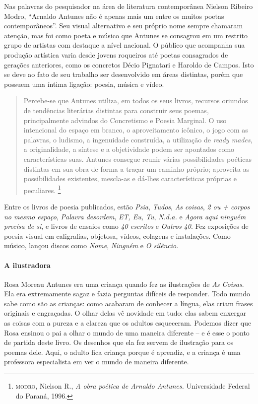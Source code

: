 \documentclass[11pt]{extarticle}
\begin{document}
Nas palavras do pesquisador na área de literatura contemporânea Nielson Ribeiro Modro, 
``Arnaldo Antunes não é apenas mais um entre os muitos poetas contemporâneos''.
Seu visual alternativo e seu próprio nome sempre chamaram atenção, mas foi como poeta 
e músico que Antunes se consagrou em um
restrito grupo de artistas com destaque a nível nacional. O público que acompanha sua
produção artística varia desde jovens roqueiros até poetas consagrados de gerações anteriores, como os concretos Décio
Pignatari e Haroldo de Campos. Isto se deve ao fato de seu trabalho ser desenvolvido em
áreas distintas, porém que possuem uma íntima ligação: poesia, música e vídeo.

\begin{quote}
Percebe-se que Antunes
utiliza, em todos os seus livros, recursos oriundos de tendências literárias distintas para
construir seus poemas, principalmente advindos do Concretismo e Poesia Marginal. O uso
intencional do espaço em branco, o aproveitamento icônico, o jogo com as palavras, o
ludismo, a ingenuidade construída, a utilização de \textit{ready mades}, a originalidade, a síntese e
a objetividade podem ser apontados como características suas. Antunes consegue reunir
várias possibilidades poéticas distintas em sua obra de forma a traçar um caminho próprio;
aproveita as possibilidades existentes, mescla-as e dá-lhes características próprias e
peculiares. \footnote{\textsc{modro}, Nielson R., \textit{A obra poética de Arnaldo Antunes.} Universidade Federal do Paraná, 1996.}
\end{quote}


Entre os livros de poesia publicados, estão \emph{Psia}, \emph{Tudos}, 
\emph{As coisas}, \emph{2 ou + corpos no mesmo espaço}, \emph{Palavra desordem}, 
\emph{ET, Eu, Tu}, \emph{N.d.a.} e \emph{Agora aqui ninguém precisa de si}, 
e livros de ensaios como \emph{40 escritos} e \emph{Outros 40}.  
Fez exposições de poesia visual em caligrafias, objetosa, vídeos, colagens e instalações. 
Como músico, lançou discos como \emph{Nome}, \emph{Ninguém} e \emph{O silêncio}.

\paragraph{A ilustradora}

Rosa Moreau Antunes era uma criança quando fez as ilustrações de \textit{As Coisas}. Ela era extremamente sagaz e fazia perguntas difíceis de responder. Todo mundo sabe como são as crianças: como acabaram de conhecer a língua, elas criam frases originais e engraçadas. O olhar delas vê novidade em tudo: elas sabem enxergar as coisas com a pureza e a clareza que os adultos esqueceram. Podemos dizer que Rosa ensinou o pai a olhar o mundo de uma maneira diferente -- e é esse o ponto de partida deste livro. Os desenhos que ela fez servem de ilustração para os poemas dele. Aqui, o adulto fica criança porque é aprendiz, e a criança é uma professora especialista em ver o mundo de maneira diferente.   
\end{document}
